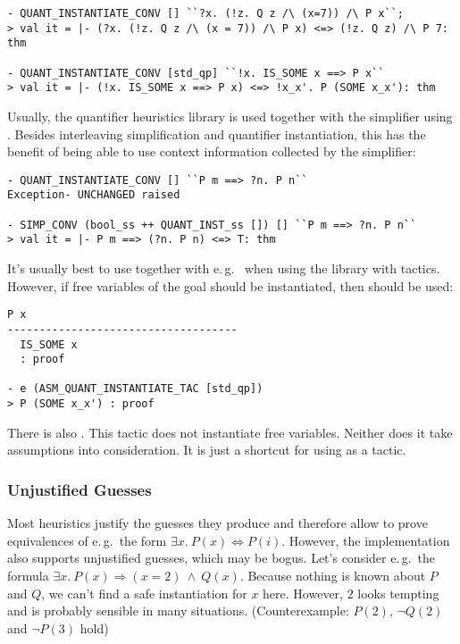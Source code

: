 \begin{session}
\begin{verbatim}
- QUANT_INSTANTIATE_CONV [] ``?x. (!z. Q z /\ (x=7)) /\ P x``;
> val it = |- (?x. (!z. Q z /\ (x = 7)) /\ P x) <=> (!z. Q z) /\ P 7: thm

- QUANT_INSTANTIATE_CONV [std_qp] ``!x. IS_SOME x ==> P x``
> val it = |- (!x. IS_SOME x ==> P x) <=> !x_x'. P (SOME x_x'): thm
\end{verbatim}
\end{session}

Usually, the quantifier heuristics library is used together with the
simplifier using . Besides interleaving
simplification and quantifier instantiation, this has the benefit of
being able to use context information collected by the simplifier:

\begin{session}
\begin{verbatim}
- QUANT_INSTANTIATE_CONV [] ``P m ==> ?n. P n``
Exception- UNCHANGED raised

- SIMP_CONV (bool_ss ++ QUANT_INST_ss []) [] ``P m ==> ?n. P n``
> val it = |- P m ==> (?n. P n) <=> T: thm
\end{verbatim}
\end{session}

It's usually best to use 
together with e.\,g.\  when using the library with tactics.
However, if free variables of the goal should be instantiated, then
 should be used:

\begin{session}
\begin{verbatim}
P x
------------------------------------
  IS_SOME x
  : proof

- e (ASM_QUANT_INSTANTIATE_TAC [std_qp])
> P (SOME x_x') : proof
\end{verbatim}
\end{session}

There is also . This tactic does not
instantiate free variables. Neither does it take assumptions into consideration.
It is just a shortcut for using  as a tactic.


\subsubsection{Unjustified Guesses}

Most heuristics justify the guesses they produce and therefore allow to
prove equivalences of e.\,g.\ the form $\exists x.\ P(x) \Leftrightarrow P(i)$.
However, the implementation also supports unjustified guesses, which may be bogus.
Let's consider e.\,g.\ the formula $\exists x.\ P(x) \Longrightarrow (x = 2)\ \wedge\ Q(x)$.
Because nothing is known about $P$ and $Q$, we can't find a safe instantiation for $x$ here.
However, $2$ looks tempting and is probably sensible in many situations. (Counterexample:
$P(2)$, $\neg Q(2)$ and $\neg P(3)$ hold)

